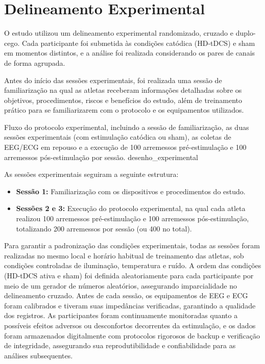 \section{Delineamento Experimental}

O estudo utilizou um delineamento experimental randomizado, cruzado e duplo-cego. Cada participante foi submetida às condições catódica (HD-tDCS) e sham em momentos distintos, e a análise foi realizada considerando os pares de canais de forma agrupada.

Antes do início das sessões experimentais, foi realizada uma sessão de familiarização na qual as atletas receberam informações detalhadas sobre os objetivos, procedimentos, riscos e benefícios do estudo, além de treinamento prático para se familiarizarem com o protocolo e os equipamentos utilizados.

{Fluxo do protocolo experimental, incluindo a sessão de familiarização, as duas sessões experimentais (com estimulação catódica ou sham), as coletas de EEG/ECG em repouso e a execução de 100 arremessos pré-estimulação e 100 arremessos pós-estimulação por sessão.}
{desenho_experimental}

As sessões experimentais seguiram a seguinte estrutura:
\begin{itemize}
    \item \textbf{Sessão 1:} Familiarização com os dispositivos e procedimentos do estudo.
    \item \textbf{Sessões 2 e 3:} Execução do protocolo experimental, na qual cada atleta realizou 100 arremessos pré-estimulação e 100 arremessos pós-estimulação, totalizando 200 arremessos por sessão (ou 400 no total).
\end{itemize}


Para garantir a padronização das condições experimentais, todas as sessões foram realizadas no mesmo local e horário habitual de treinamento das atletas, sob condições controladas de iluminação, temperatura e ruído. A ordem das condições (HD-tDCS ativa e sham) foi definida aleatoriamente para cada participante por meio de um gerador de números aleatórios, assegurando imparcialidade no delineamento cruzado. Antes de cada sessão, os equipamentos de EEG e ECG foram calibrados e tiveram suas impedâncias verificadas, garantindo a qualidade dos registros. As participantes foram continuamente monitoradas quanto a possíveis efeitos adversos ou desconfortos decorrentes da estimulação, e os dados foram armazenados digitalmente com protocolos rigorosos de backup e verificação de integridade, assegurando sua reprodutibilidade e confiabilidade para as análises subsequentes.


